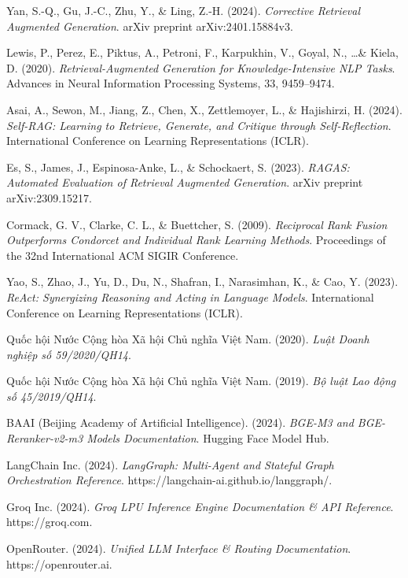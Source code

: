 \begin{enumerate}[label={[\arabic*]}]
    \item Yan, S.-Q., Gu, J.-C., Zhu, Y., \& Ling, Z.-H. (2024). \textit{Corrective Retrieval Augmented Generation}. arXiv preprint arXiv:2401.15884v3.
    \item Lewis, P., Perez, E., Piktus, A., Petroni, F., Karpukhin, V., Goyal, N., \dots \& Kiela, D. (2020). \textit{Retrieval-Augmented Generation for Knowledge-Intensive NLP Tasks}. Advances in Neural Information Processing Systems, 33, 9459--9474.
    \item Asai, A., Sewon, M., Jiang, Z., Chen, X., Zettlemoyer, L., \& Hajishirzi, H. (2024). \textit{Self-RAG: Learning to Retrieve, Generate, and Critique through Self-Reflection}. International Conference on Learning Representations (ICLR).
    \item Es, S., James, J., Espinosa-Anke, L., \& Schockaert, S. (2023). \textit{RAGAS: Automated Evaluation of Retrieval Augmented Generation}. arXiv preprint arXiv:2309.15217.
    \item Cormack, G. V., Clarke, C. L., \& Buettcher, S. (2009). \textit{Reciprocal Rank Fusion Outperforms Condorcet and Individual Rank Learning Methods}. Proceedings of the 32nd International ACM SIGIR Conference.
    \item Yao, S., Zhao, J., Yu, D., Du, N., Shafran, I., Narasimhan, K., \& Cao, Y. (2023). \textit{ReAct: Synergizing Reasoning and Acting in Language Models}. International Conference on Learning Representations (ICLR).
    \item Quốc hội Nước Cộng hòa Xã hội Chủ nghĩa Việt Nam. (2020). \textit{Luật Doanh nghiệp số 59/2020/QH14}.
    \item Quốc hội Nước Cộng hòa Xã hội Chủ nghĩa Việt Nam. (2019). \textit{Bộ luật Lao động số 45/2019/QH14}.
    \item BAAI (Beijing Academy of Artificial Intelligence). (2024). \textit{BGE-M3 and BGE-Reranker-v2-m3 Models Documentation}. Hugging Face Model Hub.
    \item LangChain Inc. (2024). \textit{LangGraph: Multi-Agent and Stateful Graph Orchestration Reference}. https://langchain-ai.github.io/langgraph/.
    \item Groq Inc. (2024). \textit{Groq LPU Inference Engine Documentation \& API Reference}. https://groq.com.
    \item OpenRouter. (2024). \textit{Unified LLM Interface \& Routing Documentation}. https://openrouter.ai.
\end{enumerate}
